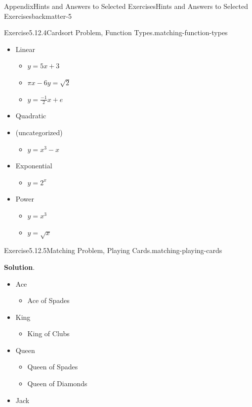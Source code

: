 \documentclass[oneside,10pt,]{book}
\newcommand{\blocktitlefont}{\relax}
\numberwithin{equation}{section}
\begin{document}
\begin{solutions-chapter}{Appendix}{Hints and Answers to Selected Exercises}{}{Hints and Answers to Selected Exercises}{}{}{backmatter-5}
\begin{divisionsolution}{Exercise}{5.12.4}{Cardsort Problem, Function Types.}{matching-function-types}
\begin{itemize}[label=\textbullet]
\item{}Linear%
\begin{itemize}[label=$\circ$]
\item{}\(y=5x+3\)%
\item{}\(\pi x - 6y = \sqrt{2}\)%
\item{}\(y=\frac{-1}{2}x+e\)%
\end{itemize}
%
\item{}Quadratic%
\item{}(uncategorized)%
\begin{itemize}[label=$\circ$]
\item{}\(y=x^3-x\)%
\end{itemize}
%
\item{}Exponential%
\begin{itemize}[label=$\circ$]
\item{}\(y=2^x\)%
\end{itemize}
%
\item{}Power%
\begin{itemize}[label=$\circ$]
\item{}\(y=x^3\)%
\item{}\(y=\sqrt{x}\)%
\end{itemize}
%
\end{itemize}
%
\end{divisionsolution}%
\begin{divisionsolution}{Exercise}{5.12.5}{Matching Problem, Playing Cards.}{matching-playing-cards}%
\par\smallskip%
\noindent\textbf{\blocktitlefont Solution}.\hypertarget{matching-playing-cards-4-back}{}\quad{}%
\begin{itemize}[label=\textbullet]
\item{}Ace%
\begin{itemize}[label=$\circ$]
\item{}Ace of Spades%
\end{itemize}
%
\item{}King%
\begin{itemize}[label=$\circ$]
\item{}King of Clubs%
\end{itemize}
%
\item{}Queen%
\begin{itemize}[label=$\circ$]
\item{}Queen of Spades%
\item{}Queen of Diamonds%
\end{itemize}
%
\item{}Jack%
\begin{itemize}[label=$\circ$]

\end{itemize}
\end{itemize}
\end{divisionsolution}
\end{solutions-chapter}
\end{document}
